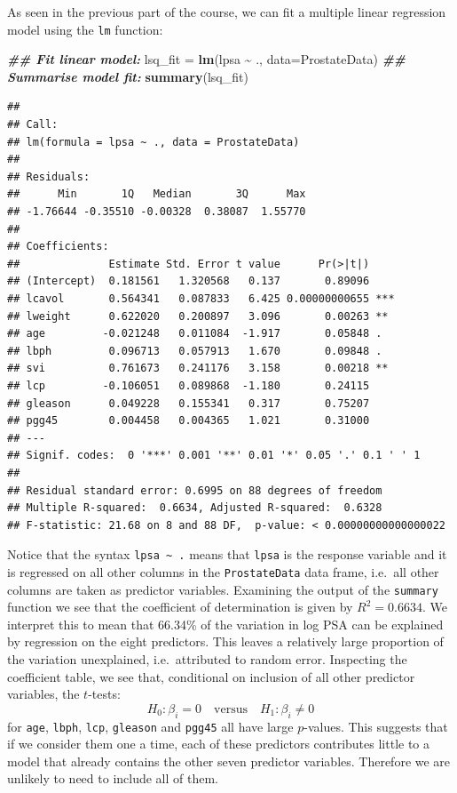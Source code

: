 \documentclass[
]{article}
\newenvironment{Shaded}{\begin{snugshade}}{\end{snugshade}}
\newcommand{\AttributeTok}[1]{\textcolor[rgb]{0.13,0.29,0.53}{#1}}
\newcommand{\DocumentationTok}[1]{\textcolor[rgb]{0.56,0.35,0.01}{\textbf{\textit{#1}}}}
\newcommand{\FunctionTok}[1]{\textcolor[rgb]{0.13,0.29,0.53}{\textbf{#1}}}
\newcommand{\NormalTok}[1]{#1}
\newcommand{\OtherTok}[1]{\textcolor[rgb]{0.56,0.35,0.01}{#1}}
\newcommand{\SpecialCharTok}[1]{\textcolor[rgb]{0.81,0.36,0.00}{\textbf{#1}}}
\begin{document}
As seen in the previous part of the course, we can fit a multiple linear
regression model using the \texttt{lm} function:

\begin{Shaded}
\begin{Highlighting}[]
\DocumentationTok{\#\# Fit linear model:}
\NormalTok{lsq\_fit }\OtherTok{=} \FunctionTok{lm}\NormalTok{(lpsa }\SpecialCharTok{\textasciitilde{}}\NormalTok{ ., }\AttributeTok{data=}\NormalTok{ProstateData)}
\DocumentationTok{\#\# Summarise model fit:}
\FunctionTok{summary}\NormalTok{(lsq\_fit)}
\end{Highlighting}
\end{Shaded}

\begin{verbatim}
## 
## Call:
## lm(formula = lpsa ~ ., data = ProstateData)
## 
## Residuals:
##      Min       1Q   Median       3Q      Max 
## -1.76644 -0.35510 -0.00328  0.38087  1.55770 
## 
## Coefficients:
##              Estimate Std. Error t value      Pr(>|t|)    
## (Intercept)  0.181561   1.320568   0.137       0.89096    
## lcavol       0.564341   0.087833   6.425 0.00000000655 ***
## lweight      0.622020   0.200897   3.096       0.00263 ** 
## age         -0.021248   0.011084  -1.917       0.05848 .  
## lbph         0.096713   0.057913   1.670       0.09848 .  
## svi          0.761673   0.241176   3.158       0.00218 ** 
## lcp         -0.106051   0.089868  -1.180       0.24115    
## gleason      0.049228   0.155341   0.317       0.75207    
## pgg45        0.004458   0.004365   1.021       0.31000    
## ---
## Signif. codes:  0 '***' 0.001 '**' 0.01 '*' 0.05 '.' 0.1 ' ' 1
## 
## Residual standard error: 0.6995 on 88 degrees of freedom
## Multiple R-squared:  0.6634, Adjusted R-squared:  0.6328 
## F-statistic: 21.68 on 8 and 88 DF,  p-value: < 0.00000000000000022
\end{verbatim}

Notice that the syntax \texttt{lpsa\ \textasciitilde{}\ .} means that
\texttt{lpsa} is the response variable and it is regressed on all other
columns in the \texttt{ProstateData} data frame, i.e.~all other columns
are taken as predictor variables. Examining the output of the
\texttt{summary} function we see that the coefficient of determination
is given by \(R^2=0.6634\). We interpret this to mean that 66.34\% of
the variation in log PSA can be explained by regression on the eight
predictors. This leaves a relatively large proportion of the variation
unexplained, i.e.~attributed to random error. Inspecting the coefficient
table, we see that, conditional on inclusion of all other predictor
variables, the \(t\)-tests: \begin{equation*}
H_0: \beta_i = 0 \quad \text{versus} \quad H_1: \beta_i \ne 0
\end{equation*} for \texttt{age}, \texttt{lbph}, \texttt{lcp},
\texttt{gleason} and \texttt{pgg45} all have large \(p\)-values. This
suggests that if we consider them one a time, each of these predictors
contributes little to a model that already contains the other seven
predictor variables. Therefore we are unlikely to need to include all of
them.
\end{document}
